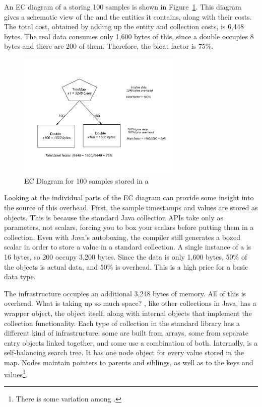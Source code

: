 An EC diagram of a  storing 100 samples is shown in
Figure~\ref{fig:content-schematic-treemap-doubles}.  This diagram gives a
schematic view of the  and the entities it contains, along with
their costs. The total cost, obtained by adding up the entity and collection
costs, is 6,448 bytes. The real data consumes only 1,600 bytes of this, since a
double occupies 8 bytes and there are 200 of them. Therefore, the bloat factor
is 75\%.

\begin{figure}
  \centering
  \includegraphics[width=0.7\textwidth]{part1/Figures/memoryhealth/treemap-doubles}
  \caption{EC Diagram for 100 samples stored in a }
  \label{fig:content-schematic-treemap-doubles}
\end{figure} 
 
Looking at the individual parts of the EC diagram can provide some insight into
the source of this overhead. First, the sample timestamps and values are stored
as  objects. This is because the standard Java collection APIs take
only  as parameters, not scalars, forcing you to box your
scalars before putting them in a collection. Even with Java's autoboxing, the compiler
still generates a boxed scalar in order to store a value in a standard
collection.  A single instance of a  is 16 bytes, so 200
 occupy 3,200 bytes. Since the data is only 1,600 bytes, 50\% of
the  objects is actual data, and 50\% is overhead. This is a high
price for a basic data type.

The  infrastructure occupies an additional 3,248 bytes of
memory. All of this is overhead. What is taking up so much space? 
, like other collections in Java, has a wrapper object, the
 object itself, along with internal objects that implement
the collection functionality. Each type of collection in the standard library
has a different kind of infrastructure: some are built from arrays, some from
separate entry objects linked together, and some use a combination of both.
Internally,  is a self-balancing search tree. It has one
node object for every value stored in the map. Nodes maintain pointers to
parents and siblings, as well as to the keys and values\footnote{There is some
variation among \jres.}.

